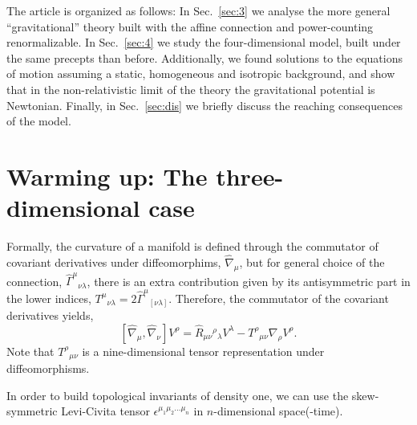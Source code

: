 \documentclass[twocolumn,aps,
  showpacs,showkeys,prd,superscriptaddress]{revtex4-1}
\newcommand{\Ga}{\Gamma}
\newcommand\nab[1]{\nabla_{{#1}}}
\newcommand{\comm}[2]{\left[#1,#2\right]}
\renewcommand{\(}{\left(}
\renewcommand{\)}{\right)}
\renewcommand{\[}{\left[}
\renewcommand{\]}{\right]}
\begin{document}

The article is organized as follows: In Sec.~\ref{sec:3} we analyse the more general ``gravitational'' theory built with the affine connection and power-counting renormalizable. In Sec.~\ref{sec:4} we study the four-dimensional model, built under the same precepts than before. Additionally, we found solutions to the equations of motion assuming a static, homogeneous and isotropic background, and show that in the non-relativistic limit of the theory the gravitational potential is Newtonian. Finally, in Sec.~\ref{sec:dis} we briefly discuss the reaching consequences of the model.



\section{\label{sec:3} Warming up: The three-dimensional case}


Formally, the curvature of a manifold is defined through the commutator of covariant derivatives under diffeomorphims, $\hat{\nabla}_\mu$, but for general choice of the connection, $\hat{\Ga}^\mu{}_{\nu\lambda}$, there is an extra contribution given by its antisymmetric part in the lower indices, $T^\mu{}_{\nu\lambda} = 2\hat{\Ga}^\mu{}_{[\nu\lambda]}$. Therefore, the commutator of the covariant derivatives yields,
\begin{equation}
  \comm{\hat{\nabla}_{\mu}}{\hat{\nabla}_{\nu}}V^\rho = \hat{R}_{\mu\nu}{}^\rho{}_\lambda V^\lambda - T^\rho{}_{\mu\nu}\nab{\rho}V^\rho.
  \label{curvdef}
\end{equation}
Note that $T^\rho{}_{\mu\nu}$ is a nine-dimensional tensor representation under diffeomorphisms.

In order to build topological invariants of density one, we can use the skew-symmetric Levi-Civita tensor $\epsilon^{\mu_1\mu_2\dots\mu_n}$ in $n$-dimensional space(-time).
\end{document}
